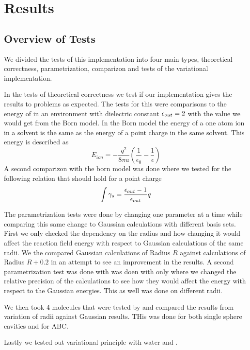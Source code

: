 \documentclass[../master_thesis.tex]{subfiles}
\begin{document}
\chapter{Results}\label{chap:Results}
\section{Overview of Tests}
We divided the tests of this implementation into four main types, theoretical
correctness, parametrization, comparizon and tests of the variational implementation.

In the tests of theoretical correctness we test if our implementation gives the
results to problems as expected. The tests for this were comparisons to
the energy of   in an environment with dielectric constant $\epsilon_{out} = 2$
with the value we would get from the Born model. In the Born model the energy of a  %
one atom ion in a solvent is the same as the energy of a point charge in the same solvent.
This energy is described as
\begin{equation}
  E_{ion} = -\frac{q^{2}}{8 \pi a}\left(\frac{1}{\epsilon_{0}}-\frac{1}{\epsilon}\right)
\end{equation}
A second comparizon with the born model was done where we tested for the
following relation that should hold for a point charge
\begin{equation}
  \int \gamma_s = \frac{\epsilon_{out} - 1}{\epsilon_{out}} q
\end{equation}

The parametrization tests were done by changing one parameter at a time while
comparing this same change to Gaussian calculations with different basis sets.
First we only checked the dependency on the radius and how changing it would
affect the reaction field energy with respect to Gaussian calculations of the same
radii. We the compared Gaussian calculations of Radius $R$ against \mrchem
calculations of Radius $R+0.2$ in an attempt to see an improvement in the
results.
A second parametrization test was done with was doen with only 
where we changed the relative precision of the \mrchem calculations to see how
they would affect the energy with respect to the Gaussian energies. This as well
was done on different radii.

We then took 4 molecules that were tested by \cite{Chipman2002} and compared the
results from variation of radii against Gaussian results. THis was done for both
single sphere cavities and for \ac{ABC}.

Lastly we tested out variational principle with water and .
\end{document}
